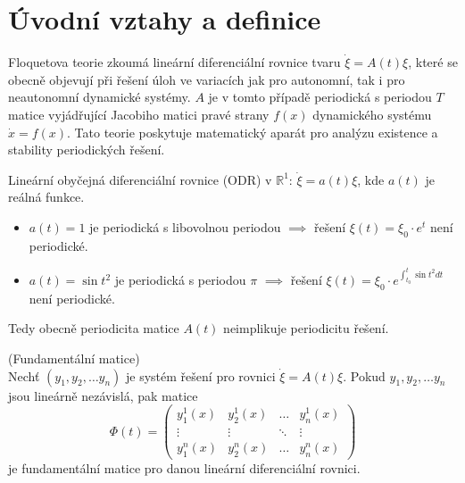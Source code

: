 \section{Úvodní vztahy a definice}\label{sec:uvod}

Floquetova teorie zkoumá lineární diferenciální rovnice tvaru  $\dot{\xi } = A(t) \xi$, které se obecně objevují při řešení úloh ve variacích jak pro autonomní, tak i pro neautonomní dynamické systémy. $A$ je v tomto případě periodická s periodou $T$ matice vyjádřující Jacobiho matici pravé strany $f(x)$ dynamického systému $\dot{x} = f(x)$.  Tato teorie poskytuje matematický aparát pro analýzu existence a stability periodických řešení.

\medskip

\begin{exmp}
	Lineární obyčejná diferenciální rovnice (ODR) v $\mathbb{R}^{1}$: $\dot{\xi} = a(t)  \xi$, kde $a(t)$ je reálná funkce.
	
	\begin{itemize}
		\item $a(t) = 1$ je periodická s libovolnou periodou $\implies$ řešení $\xi(t) = \xi_{0} \cdot e^{t}$ není  periodické.
		\item $a(t) = \sin t^{2}$ je periodická s periodou $\pi$ $\implies$ řešení $\xi(t) = \xi_{0} \cdot e^{ \int_{t_{0}}^{t} \sin t^{2} dt }$ není periodické.
	\end{itemize}

	Tedy obecně periodicita matice $A(t)$ neimplikuje periodicitu řešení.
\end{exmp}

\medskip

\begin{defn} (Fundamentální matice) \\
	Nechť $(y_{1}, y_{2}, \dots y_{n})$ je systém řešení pro rovnici $\dot{\xi } = A(t) \xi$. Pokud $y_{1}, y_{2}, \dots y_{n}$ jsou lineárně nezávislá, pak matice 
	\begin{equation}
		\Phi(t) = 
		\begin{pmatrix} 
			y_{1}^{1}(x) & y_{2}^{1}(x) & \dots  & y_{n}^{1}(x) \\ 
			\vdots &  \vdots & \ddots & \vdots \\ 
			y_{1}^{n}(x) & y_{2}^{n}(x) & \dots & y_{n}^{n}(x) 
		\end{pmatrix} 
	\end{equation}
	je fundamentální matice pro danou lineární diferenciální rovnici.
\end{defn}

